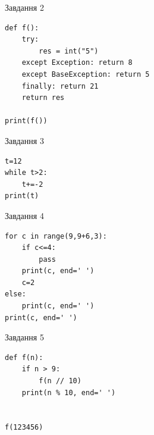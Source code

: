 \documentclass[12pt, ukrainian]{article}
\begin{document}
{{{{{{{\begin{minipage}[t]{8.5cm}
\vspace{5mm}
               
{\begin{center}Завдання {2}\end{center}}
\vspace{-6mm}

\begin{verbatim}
def f():
    try:
        res = int("5")
    except Exception: return 8
    except BaseException: return 5
    finally: return 21
    return res

print(f())
\end{verbatim}


\vspace{5mm}
               
{\begin{center}Завдання {3}\end{center}}
\vspace{-6mm}

\begin{verbatim}
t=12
while t>2:
    t+=-2
print(t)
\end{verbatim}


\end{minipage}
\vline \hspace{6mm}
\begin{minipage}[t]{10.7cm}
               
{\begin{center}Завдання {4}\end{center}}
\vspace{-6mm}

\begin{verbatim}
for c in range(9,9+6,3):
    if c<=4:
        pass
    print(c, end=' ')
    c=2
else:
    print(c, end=' ')
print(c, end=' ')
\end{verbatim}


\vspace{5mm}
               
{\begin{center}Завдання {5}\end{center}}
\vspace{-6mm}

\begin{verbatim}
def f(n):
    if n > 9:
        f(n // 10)
    print(n % 10, end=' ')
    

f(123456)
\end{verbatim}


\end{minipage}

}}}}}}}
\end{document}
